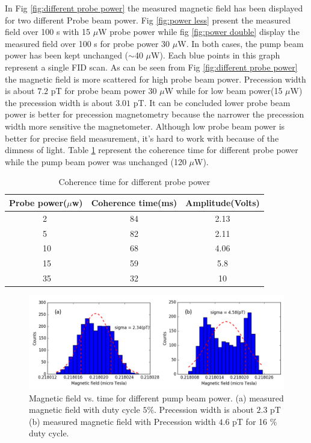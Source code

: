  In Fig \ref{fig:different probe power} the measured magnetic field has been displayed for two different  Probe beam power. Fig \ref{fig:power less} present the measured field over 100 s with 15 $\mu$W probe power while fig \ref{fig:power double} display the measured field over 100 s for probe power 30 $\mu$W. In both cases, the pump beam power has been kept unchanged ($\sim $40 $\mu$W). Each blue points in this graph represent a single FID scan. As can be seen from Fig \ref{fig:different probe power} the magnetic field is more scattered for high probe beam power. Precession width is about $7.2$ pT for probe beam power 30 $\mu$W while for low beam power(15 $\mu$W) the precession width is about $3.01$ pT. It can be concluded lower probe beam power is better for precession  magnetometry because the narrower the precession width more sensitive the magnetometer. Although low probe beam power is better for precise field measurement, it's hard to work with because of the dimness of light.
Table  \ref{table:Coherence time for different probe power} represent the coherence time for different probe power while the pump beam power was unchanged (120 $\mu$W).
 \begin{table}%
\centering
\begin{tabular}{|l  |c|c|}\hline
\textbf{Probe power($\mu$w)}    & \textbf{Coherence time(ms)}  & \textbf{Amplitude(Volts)}\\\hline
~~~~~~~~2 & 84 & 2.13   \\
\hline
~~~~~~~~5    & 82 & 2.11  \\
\hline
~~~~~~~~10   &  68 & 4.06 \\
\hline
~~~~~~~~15  &   59 & 5.8  \\
\hline
~~~~~~~~35  &   32 & 10  \\
\hline
\end{tabular}
\caption{Coherence time for different probe power\label{table:Coherence time for different probe power}}
\end{table}
 
 \begin{figure}
    \centering  \includegraphics[width=\textwidth]{figures/pump_beam}
    \caption{ Magnetic field vs. time for different pump beam power. (a) measured magnetic field with duty cycle $5 \%$. Precession width is about $2.3$ pT (b) measured magnetic field with Precession width $4.6$ pT for  16 $\%$ duty cycle.}
    \label{fig:different pump power}
\end{figure}


